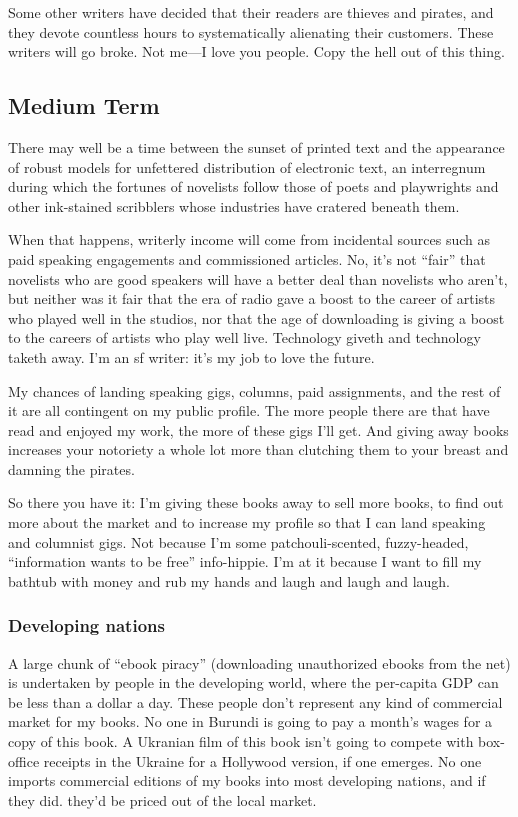 \documentclass{article}
\begin{document}
Some other writers have decided that their readers are thieves and
pirates, and they devote countless hours to systematically alienating
their customers.  These writers will go broke.  Not me---I love you
people.  Copy the hell out of this thing.

\subsection{Medium Term}

There may well be a time between the sunset of printed text and the
appearance of robust models for unfettered distribution of electronic
text, an interregnum during which the fortunes of novelists follow
those of poets and playwrights and other ink-stained scribblers whose
industries have cratered beneath them.

When that happens, writerly income will come from incidental sources
such as paid speaking engagements and commissioned articles.  No, it's
not ``fair'' that novelists who are good speakers will have a better
deal than novelists who aren't, but neither was it fair that the era
of radio gave a boost to the career of artists who played well in the
studios, nor that the age of downloading is giving a boost to the
careers of artists who play well live.  Technology giveth and
technology taketh away.  I'm an sf writer:  it's my job to love the
future.

My chances of landing speaking gigs, columns, paid assignments, and
the rest of it are all contingent on my public profile.  The more
people there are that have read and enjoyed my work, the more of these
gigs I'll get.  And giving away books increases your notoriety a whole
lot more than clutching them to your breast and damning the pirates.

So there you have it:  I'm giving these books away to sell more books,
to find out more about the market and to increase my profile so that I
can land speaking and columnist gigs.  Not because I'm some
patchouli-scented, fuzzy-headed, ``information wants to be free''
info-hippie.  I'm at it because I want to fill my bathtub with money
and rub my hands and laugh and laugh and laugh.


\subsubsection{Developing nations}

A large chunk of ``ebook piracy'' (downloading unauthorized ebooks
from the net) is undertaken by people in the developing world, where
the per-capita GDP can be less than a dollar a day.  These people
don't represent any kind of commercial market for my books.  No one in
Burundi is going to pay a month's wages for a copy of this book.  A
Ukranian film of this book isn't going to compete with box-office
receipts in the Ukraine for a Hollywood version, if one emerges.  No
one imports commercial editions of my books into most developing
nations, and if they did.  they'd be priced out of the local market. 
\end{document}
